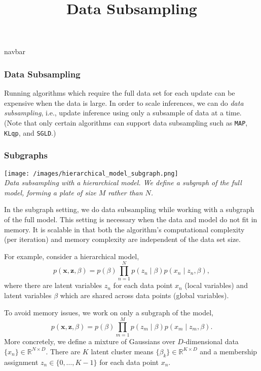 \title{Data Subsampling}

{{navbar}}

\subsubsection{Data Subsampling}

Running algorithms which require the full data set for each update
can be expensive when the data is large. In order to scale inferences,
we can do \emph{data subsampling}, i.e., update inference using
only a subsample of data at a time.
(Note that only certain algorithms can support data subsampling such as
\texttt{MAP}, \texttt{KLqp}, and \texttt{SGLD}.)

\subsubsection{Subgraphs}

\texttt{[image: /images/hierarchical\_model\_subgraph.png]} \\
{\small\textit{Data subsampling with a hierarchical model. We define
a subgraph of the full model, forming a plate of size $M$ rather than
$N$.}}

In the subgraph setting, we do data subsampling while working with a
subgraph of the full model. This setting is necessary when the data
and model do not fit in memory.
It is scalable in that both the
algorithm's computational complexity (per iteration) and memory
complexity are independent of the data set size.

For example, consider a hierarchical model,
\begin{equation*}
p(\mathbf{x}, \mathbf{z}, \beta)
= p(\beta) \prod_{n=1}^N p(z_n \mid \beta) p(x_n \mid z_n, \beta),
\end{equation*}
where there are latent variables $z_n$ for
each data point $x_n$ (local variables) and latent variables $\beta$
which are shared across data points (global variables).

To avoid memory issues, we work on only a subgraph of the model,
\begin{equation*}
p(\mathbf{x}, \mathbf{z}, \beta)
= p(\beta) \prod_{m=1}^M p(z_m \mid \beta) p(x_m \mid z_m, \beta).
\end{equation*}
More concretely, we define a mixture of Gaussians over
$D$-dimensional data $\{x_n\}\in\mathbb{R}^{N\times D}$. There are $K$
latent cluster means $\{\beta_k\}\in\mathbb{R}^{K\times D}$ and a
membership assignment $z_n\in\{0,\ldots,K-1\}$ for each data point
$x_n$.

